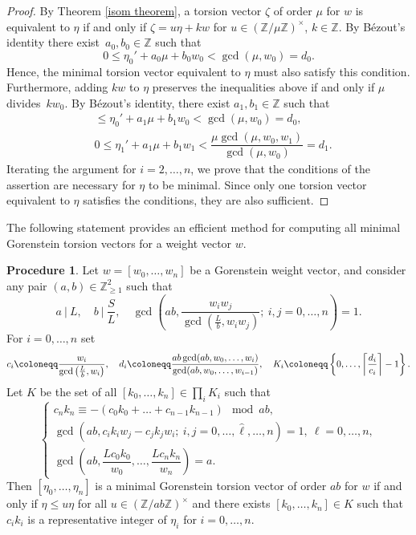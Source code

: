 \documentclass{amsart}
\newcommand{\Z}{\mathbb{Z}}
\theoremstyle{definition}
\newtheorem{procedure}[lem]{Procedure}
\begin{document}
\begin{proof}
    By Theorem \ref{isom theorem}, a torsion vector $\zeta$ of order $\mu$ for $w$ is equivalent to $\eta$ if and only if $\zeta=u\eta+kw$ for $u\in(\Z/\mu\Z)^\times$, $k\in\Z$.
    By Bézout's identity there exist~$a_0,b_0\in\Z$ such that $$0\leq\eta_0'+a_0\mu+b_0w_0<\gcd(\mu,w_0)=d_0.$$
    Hence, the minimal torsion vector equivalent to $\eta$ must also satisfy this condition.
    Furthermore, adding $kw$ to $\eta$ preserves the inequalities above if and only if $\mu$ divides~$kw_0$. By Bézout's identity, there exist $a_1,b_1\in\Z$ such that 
    \begin{align*}
    & \leq\eta_0'+a_1\mu+b_1w_0<\gcd(\mu,w_0)=d_0, \\    & 0\leq\eta_1'+a_1\mu+b_1w_1<\dfrac{\mu\gcd(\mu,w_0,w_1)}{\gcd(\mu,w_0)}=d_1.
    \end{align*}
    Iterating the argument for $i=2,\dots,n$, we prove that the conditions of the assertion are necessary for $\eta$ to be minimal. 
    Since only one torsion vector equivalent to $\eta$ satisfies the conditions, they are also sufficient.
\end{proof}

The following statement provides an efficient method for computing all minimal Gorenstein torsion vectors for a weight vector $w$.

\begin{procedure}\label{proc:torsion_vectors}
    Let $w=[w_0,\dots,w_n]$ be a Gorenstein weight vector, and consider any pair $(a,b)\in\Z_{\geq 1}^2$ such that
    $$a \ | \ L, \quad b \ | \ \frac{S}{L}, \quad \gcd\left(ab,\frac{w_iw_j}{\gcd(\frac{L}{b},w_iw_j)} ;\ i,j=0,\dots,n\right)=1.
    $$
    For $i=0,\dots,n$ set
    $$
    c_i\coloneqq\dfrac{w_i}{\gcd\left(\frac{L}{b},w_i\right)}, \quad d_i\coloneqq\dfrac{ab\gcd(ab,w_0,\dots,w_i)}{\gcd(ab,w_0,\dots,w_{i-1})},\quad K_i\coloneqq\left\{0,\dots,\left\lceil\frac{d_i}{c_i}\right\rceil-1\right\}.\\[3pt]
    $$
    Let $K$ be the set of all $[k_0,\dots,k_n]\in\prod_i K_i$ such that
    $$
    \begin{cases}
        c_nk_n\equiv-(c_0k_0+\dots+c_{n-1}k_{n-1})\mod ab, \\[5pt]
        \gcd\left(ab,c_ik_iw_j-c_jk_jw_i;\ i,j=0,\dots,\hat{\ell},\dots,n\right)=1, \ \ell=0,\dots,n,\\[5pt]
        \gcd\left(ab,\dfrac{Lc_0k_0}{w_0},\dots,\dfrac{Lc_nk_n}{w_n}\right)=a.
    \end{cases}
    $$
    Then $[\eta_0,\dots,\eta_n]$ is a minimal Gorenstein torsion vector of order $ab$ for $w$ if and only if $\eta\leq u\eta$ for all $u\in(\Z/ab\Z)^\times$ and there exists $[k_0,\dots,k_n]\in K$ such that $c_ik_i$ is a representative integer of $\eta_i$ for $i=0,\dots,n$.
\end{procedure}
\end{document}
